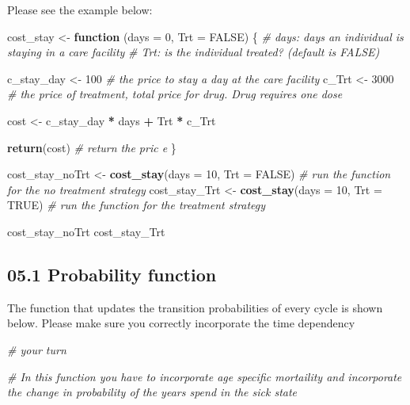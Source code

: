 \documentclass[
]{article}
\newenvironment{Shaded}{\begin{snugshade}}{\end{snugshade}}
\newcommand{\CommentTok}[1]{\textcolor[rgb]{0.56,0.35,0.01}{\textit{#1}}}
\newcommand{\ControlFlowTok}[1]{\textcolor[rgb]{0.13,0.29,0.53}{\textbf{#1}}}
\newcommand{\DataTypeTok}[1]{\textcolor[rgb]{0.13,0.29,0.53}{#1}}
\newcommand{\DecValTok}[1]{\textcolor[rgb]{0.00,0.00,0.81}{#1}}
\newcommand{\KeywordTok}[1]{\textcolor[rgb]{0.13,0.29,0.53}{\textbf{#1}}}
\newcommand{\NormalTok}[1]{#1}
\newcommand{\OperatorTok}[1]{\textcolor[rgb]{0.81,0.36,0.00}{\textbf{#1}}}
\newcommand{\OtherTok}[1]{\textcolor[rgb]{0.56,0.35,0.01}{#1}}
\newcommand{\StringTok}[1]{\textcolor[rgb]{0.31,0.60,0.02}{#1}}
\begin{document}
Please see the example below:

\begin{Shaded}
\begin{Highlighting}[]
\NormalTok{cost_stay <-}\StringTok{ }\ControlFlowTok{function}\NormalTok{ (}\DataTypeTok{days =} \DecValTok{0}\NormalTok{, }\DataTypeTok{Trt =} \OtherTok{FALSE}\NormalTok{) \{}
  \CommentTok{# days: days an individual is staying in a care facility}
  \CommentTok{# Trt:  is the individual treated? (default is FALSE) }
  
\NormalTok{  c_stay_day <-}\StringTok{ }\DecValTok{100}   \CommentTok{# the price to stay a day at the care facility}
\NormalTok{  c_Trt <-}\StringTok{ }\DecValTok{3000}       \CommentTok{# the price of treatment, total price for drug. Drug requires one dose}
  
\NormalTok{  cost <-}\StringTok{ }\NormalTok{c_stay_day }\OperatorTok{*}\StringTok{ }\NormalTok{days }\OperatorTok{+}\StringTok{ }\NormalTok{Trt }\OperatorTok{*}\StringTok{ }\NormalTok{c_Trt}

  \KeywordTok{return}\NormalTok{(cost)       }\CommentTok{# return the pric e}
\NormalTok{\}}

\NormalTok{cost_stay_noTrt <-}\StringTok{ }\KeywordTok{cost_stay}\NormalTok{(}\DataTypeTok{days =} \DecValTok{10}\NormalTok{, }\DataTypeTok{Trt =} \OtherTok{FALSE}\NormalTok{) }\CommentTok{# run the function for the no treatment strategy}
\NormalTok{cost_stay_Trt   <-}\StringTok{ }\KeywordTok{cost_stay}\NormalTok{(}\DataTypeTok{days =} \DecValTok{10}\NormalTok{, }\DataTypeTok{Trt =} \OtherTok{TRUE}\NormalTok{) }\CommentTok{# run the function for the treatment strategy}

\NormalTok{cost_stay_noTrt}
\NormalTok{cost_stay_Trt}
\end{Highlighting}
\end{Shaded}

\hypertarget{probability-function}{%
\subsection{05.1 Probability function}\label{probability-function}}

The function that updates the transition probabilities of every cycle is
shown below. Please make sure you correctly incorporate the time
dependency

\begin{Shaded}
\begin{Highlighting}[]
\CommentTok{# your turn}

\CommentTok{# In this function you have to incorporate age specific mortaility and incorporate the change in probability of the years spend in the sick state}
\end{Highlighting}
\end{Shaded}
\end{document}
